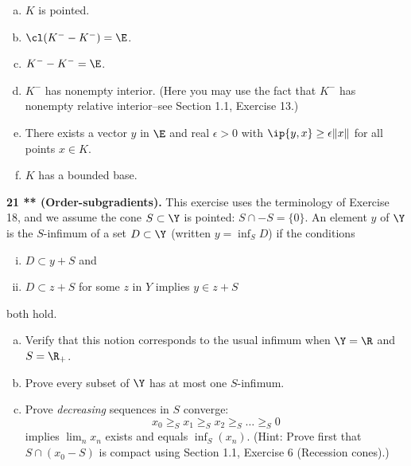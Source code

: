 \documentclass[../borwein-lewis_notes.tex]{subfiles}
\begin{document}
\begin{enumerate}[(a)]
\item $K$ is pointed. \\
\item $\cl (K^- - K^-) = \E$. \\
\item $K^- - K^- =  \E$.
\item $K^-$ has nonempty interior. (Here you may use the fact that 
$K^-$ has nonempty relative interior--see Section 1.1, Exercise 13.)
\item There exists a vector $y$ in $\E$ and real $\epsilon>0$ with 
$\ip{y,x}\geq \epsilon\|x\|$ for all points $x\in K$.
\item $K$ has a bounded base.
\end{enumerate}
\textbf{21 ** (Order-subgradients).} This exercise uses the terminology 
of Exercise 18, and we assume the cone $S\subset\Y$ is pointed: 
$S\cap -S=\{0\}$. An element $y$ of $\Y$ is the $S$-infimum of a set 
$D\subset\Y$ (written $y=\inf_S D$) if the conditions
\begin{enumerate}[(i)]
\item $D\subset y+S$ and 
\item $D\subset z+S$ for some $z$ in $Y$ implies $y\in z+S$
\end{enumerate}
both hold. 
\begin{enumerate}[(a)]
\item Verify that this notion corresponds to the usual infimum when 
$\Y=\R$ and $S=\R_+$.
\item Prove every subset of $\Y$ has at most one $S$-infimum. 
\item Prove \textit{decreasing} sequences in $S$ converge:
\begin{equation*}
x_0\geq_S x_1\geq_S x_2\geq_S\ldots\geq_S 0
\end{equation*}
implies $\lim_n x_n$ exists and equals $\inf_S(x_n)$. (Hint: Prove 
first that $S\cap (x_0-S)$ is compact using Section 1.1, Exercise 6 
(Recession cones).)
\end{enumerate}
\end{document}
